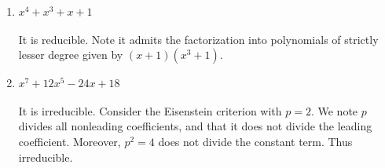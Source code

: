 \documentclass[12pt]{article}
\newenvironment{ex}[2][Exercise]{\begin{trivlist}
\item[\hskip \labelsep {\bfseries #1}\hskip \labelsep {\bfseries #2.}]}{\end{trivlist}}
\begin{document}
\begin{ex}{1}
\begin{enumerate}[label=(\alph*)]
\begin{enumerate}[label=(\roman*)]
            \item $x^4 + x^3 + x + 1$
            \\ \\ It is reducible. Note it admits the factorization into polynomials of strictly lesser degree given by $(x + 1)(x^3 + 1)$. \\
            \item $x^7 + 12x^5 - 24x + 18$
            \\ \\ It is irreducible. Consider the Eisenstein criterion with $p = 2$. We note $p$ divides all nonleading coefficients, and that it does not divide the leading coefficient. Moreover, $p^2 = 4$ does not divide the constant term. Thus irreducible.
        \end{enumerate}
    \end{enumerate}
\end{ex}
\end{document}

